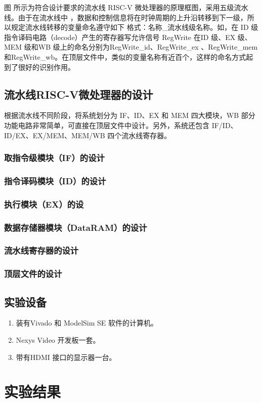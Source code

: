 \documentclass{../source/Experiment}
\begin{document}
        图  所示为符合设计要求的流水线 RISC-V 微处理器的原理框图，采用五级流水线。由于在流水线中 ，数据和控制信息将在时钟周期的上升沿转移到下一级，所以规定流水线转移的变量命名遵守如下 格式：名称\_流水线级名称。如，在 ID 级指令译码电路（decode）产生的寄存器写允许信号 RegWrite 在ID 级、EX 级、MEM 级和WB 级上的命名分别为RegWrite\_id、RegWrite\_ex 、RegWrite\_mem 和RegWrite\_wb。在顶层文件中，类似的变量名称有近百个，这样的命名方式起到了很好的识别作用。

        \subsection{流水线RISC-V微处理器的设计}
        根据流水线不同阶段，将系统划分为 IF、ID、EX 和 MEM 四大模块，WB 部分功能电路非常简单，可直接在顶层文件中设计。另外，系统还包含 IF/ID、ID/EX、EX/MEM、MEM/WB 四个流水线寄存器。
        \subsubsection{取指令级模块（IF）的设计}

        \subsubsection{指令译码模块（ID）的设计}

        \subsubsection{执行模块（EX）的设}

        \subsubsection{数据存储器模块（DataRAM）的设计}

        \subsubsection{流水线寄存器的设计}

        \subsubsection{顶层文件的设计}

    \subsection{实验设备}
        \begin{enumerate}
            \item  装有Vivado 和 ModelSim SE 软件的计算机。
            \item  Nexys Video 开发板一套。
            \item  带有HDMI 接口的显示器一台。
        \end{enumerate}

    \section{实验结果}
\end{document}
